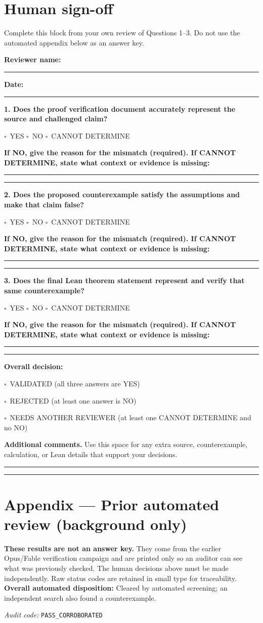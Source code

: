 \documentclass[11pt]{article}
\newcommand{\checkbox}{$\square$}
\newcommand{\answerchoices}{\checkbox\ YES \quad \checkbox\ NO \quad \checkbox\ CANNOT DETERMINE}
\newcommand{\decisionexplanation}{%
  \par\smallskip\textbf{If NO, give the reason for the mismatch (required). If
  CANNOT DETERMINE, state what context or evidence is missing:}\par
  \rule{\linewidth}{0.4pt}\par\vspace{7pt}\rule{\linewidth}{0.4pt}\par}
\begin{document}
\section*{Human sign-off}
Complete this block from your own review of Questions 1--3. Do not use the automated appendix below as an answer key.\par
\textbf{Reviewer name:} \rule{9cm}{0.4pt}\par
\textbf{Date:} \rule{4cm}{0.4pt}\par
\medskip\textbf{1. Does the proof verification document accurately represent the source and challenged claim?}\par
\answerchoices\par
\decisionexplanation
\medskip\textbf{2. Does the proposed counterexample satisfy the assumptions and make that claim false?}\par
\answerchoices\par
\decisionexplanation
\medskip\textbf{3. Does the final Lean theorem statement represent and verify that same counterexample?}\par
\answerchoices\par
\decisionexplanation
\medskip\textbf{Overall decision:}\par
\checkbox\ VALIDATED (all three answers are YES)\par
\checkbox\ REJECTED (at least one answer is NO)\par
\checkbox\ NEEDS ANOTHER REVIEWER (at least one CANNOT DETERMINE and no NO)\par
\medskip\textbf{Additional comments.} Use this space for any extra source, counterexample, calculation, or Lean details that support your decisions.\par\rule{\linewidth}{0.4pt}\par\vspace{7pt}\rule{\linewidth}{0.4pt}
\clearpage
\section*{Appendix --- Prior automated review (background only)}
\textbf{These results are not an answer key.} They come from the earlier Opus/Fable verification campaign and are printed only so an auditor can see what was previously checked. The human decisions above must be made independently. Raw status codes are retained in small type for traceability.
\textbf{Overall automated disposition:} Cleared by automated screening; an independent search also found a counterexample.
\par\textit{Audit code:} \nolinkurl{PASS_CORROBORATED}
\end{document}
